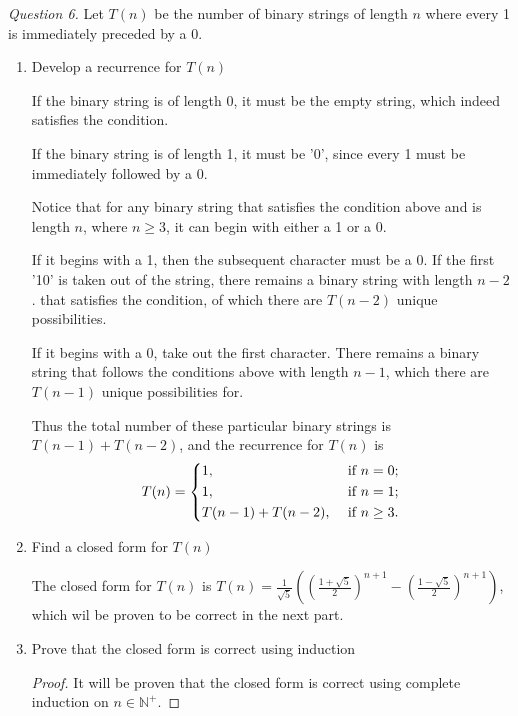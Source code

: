 \documentclass[11pt]{article}
\begin{document}
    \textit{Question 6.} Let \(T(n)\) be the number of binary strings of length \(n\) where every 1 is immediately preceded by a 0.
    \begin{enumerate}[label=(\alph*)]
        \item Develop a recurrence for \(T(n)\)
        
        If the binary string is of length 0, it must be the empty string, which indeed satisfies the condition.
        
        If the binary string is of length 1, it must be '0', since every 1 must be immediately followed by a 0.

        Notice that for any binary string that satisfies the condition above and is length \(n\), where \(n\geq 3\), it can begin with either a 1 or a 0.

        If it begins with a 1, then the subsequent character must be a 0. If the first '10' is taken out of the string, there remains a binary string with length \(n-2\). that satisfies the condition, of which there are \(T(n-2)\) unique possibilities.

        If it begins with a 0, take out the first character. There remains a binary string that follows the conditions above with length \(n-1\), which there are \(T(n-1)\) unique possibilities for.

        Thus the total number of these particular binary strings is \(T(n-1) + T(n-2)\), and the recurrence for \(T(n)\) is
        \[
            T(n)=\begin{dcases}
                1, &\text{ if } n=0 ;\\
                1, &\text{ if } n=1 ;\\
                T(n-1) + T(n-2), &\text{ if } n\geq 3.
            \end{dcases}
        \]

        \item Find a closed form for \(T(n)\) 
        
        The closed form for \(T(n)\) is \(T(n)=\frac{1}{\sqrt{5}}\left(\left(\frac{1+\sqrt{5}}{2}\right)^{n+1} - \left(\frac{1-\sqrt{5}}{2}\right)^{n+1}\right)\), which wil be proven to be correct in the next part.

        \item Prove that the closed form is correct using induction
        
        \begin{proof}
            It will be proven that the closed form is correct using complete induction on \(n \in \mathbb{N}^+\).


\end{proof}
\end{enumerate}
\end{document}
